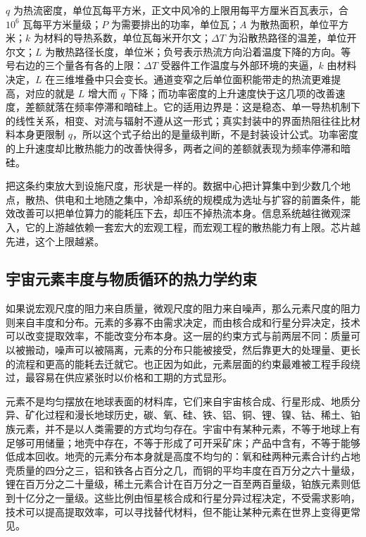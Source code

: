 $q$ 为热流密度，单位瓦每平方米，正文中风冷的上限用每平方厘米百瓦表示，合 $10^{6}$ 瓦每平方米量级；$P$ 为需要排出的功率，单位瓦；$A$ 为散热面积，单位平方米；$k$ 为材料的导热系数，单位瓦每米开尔文；$\Delta T$ 为沿散热路径的温差，单位开尔文；$L$ 为散热路径长度，单位米；负号表示热流方向沿着温度下降的方向。等号右边的三个量各有各的上限：$\Delta T$ 受器件工作温度与外部环境的夹逼，$k$ 由材料决定，$L$ 在三维堆叠中只会变长。通道变窄之后单位面积能带走的热流更难提高，对应的就是 $L$ 增大而 $q$ 下降；而功率密度的上升速度快于这几项的改善速度，差额就落在频率停滞和暗硅上。它的适用边界是：这是稳态、单一导热机制下的线性关系，相变、对流与辐射不遵从这一形式；真实封装中的界面热阻往往比材料本身更限制 $q$，所以这个式子给出的是量级判断，不是封装设计公式。功率密度的上升速度却比散热能力的改善快得多，两者之间的差额就表现为频率停滞和暗硅。

把这条约束放大到设施尺度，形状是一样的。数据中心把计算集中到少数几个地点，散热、供电和土地随之集中，冷却系统的规模成为选址与扩容的前置条件，能效改善可以把单位算力的能耗压下去，却压不掉热流本身。信息系统越往微观深入，它的上游越依赖一套宏大的宏观工程，而宏观工程的散热能力有上限。芯片越先进，这个上限越紧。

\subsection{宇宙元素丰度与物质循环的热力学约束}

如果说宏观尺度的阻力来自质量，微观尺度的阻力来自噪声，那么元素尺度的阻力则来自丰度和分布。元素的多寡不由需求决定，而由核合成和行星分异决定，技术可以改变提取效率，不能改变分布本身。这一层的约束方式与前两层不同：质量可以被搬动，噪声可以被隔离，元素的分布只能被接受，然后靠更大的处理量、更长的流程和更高的能耗去迁就它。也正因为如此，元素层面的约束最难被工程手段绕过，最容易在供应紧张时以价格和工期的方式显形。


元素不是均匀摆放在地球表面的材料库，它们来自宇宙核合成、行星形成、地质分异、矿化过程和漫长地球历史，碳、氧、硅、铁、铝、铜、锂、镍、钴、稀土、铂族元素，并不是以人类需要的方式均匀存在。宇宙中有某种元素，不等于地球上有足够可用储量；地壳中存在，不等于形成了可开采矿床；产品中含有，不等于能够低成本回收。地壳的元素分布本身就是高度不均匀的：氧和硅两种元素合计约占地壳质量的四分之三，铝和铁各占百分之几，而铜的平均丰度在百万分之六十量级，锂在百万分之二十量级，稀土元素合计在百万分之一百至两百量级，铂族元素则低到十亿分之一量级。\cite{rudnick2003composition}这些比例由恒星核合成和行星分异过程决定，不受需求影响，技术可以提高提取效率，可以寻找替代材料，但不能让某种元素在世界上变得更常见。

